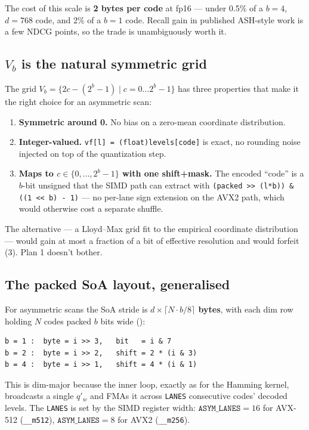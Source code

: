 \documentclass[11pt,a4paper]{article}
\begin{document}
The cost of this scale is \textbf{2 bytes per code} at fp16 --- under
0.5\% of a $b = 4$, $d = 768$ code, and 2\% of a $b = 1$ code. Recall
gain in published ASH-style work is a few NDCG points, so the trade is
unambiguously worth it.

\subsection{$V_b$ is the natural symmetric grid}

The grid $V_b = \{2c - (2^b - 1) \mid c = 0\dots 2^b - 1\}$ has three
properties that make it the right choice for an asymmetric scan:

\begin{enumerate}
    \item \textbf{Symmetric around 0.} No bias on a zero-mean coordinate
    distribution.
    \item \textbf{Integer-valued.} \texttt{vf[l] = (float)levels[code]}
    is exact, no rounding noise injected on top of the quantization
    step.
    \item \textbf{Maps to $c \in \{0, \dots, 2^b - 1\}$ with one
    shift+mask.} The encoded ``code'' is a $b$-bit unsigned that the
    SIMD path can extract with \texttt{(packed >> (l*b)) \& ((1 << b) -
    1)} --- no per-lane sign extension on the AVX2 path, which would
    otherwise cost a separate shuffle.
\end{enumerate}

The alternative --- a Lloyd--Max grid fit to the empirical coordinate
distribution --- would gain at most a fraction of a bit of effective
resolution and would forfeit (3). Plan 1 doesn't bother.

\subsection{The packed SoA layout, generalised}

For asymmetric scans the SoA stride is \textbf{$d \times \lceil N
\cdot b / 8 \rceil$ bytes}, with each dim row holding $N$ codes packed
$b$ bits wide ():

\begin{lstlisting}[style=plainstyle]
b = 1 :  byte = i >> 3,   bit   = i & 7
b = 2 :  byte = i >> 2,   shift = 2 * (i & 3)
b = 4 :  byte = i >> 1,   shift = 4 * (i & 1)
\end{lstlisting}

This is dim-major because the inner loop, exactly as for the Hamming
kernel, broadcasts a single $q'_w$ and FMAs it across \texttt{LANES}
consecutive codes' decoded levels. The \texttt{LANES} is set by the
SIMD register width: $\texttt{ASYM\_LANES} = 16$ for AVX-512
(\texttt{\_\_m512}), $\texttt{ASYM\_LANES} = 8$ for AVX2
(\texttt{\_\_m256}).
\end{document}

